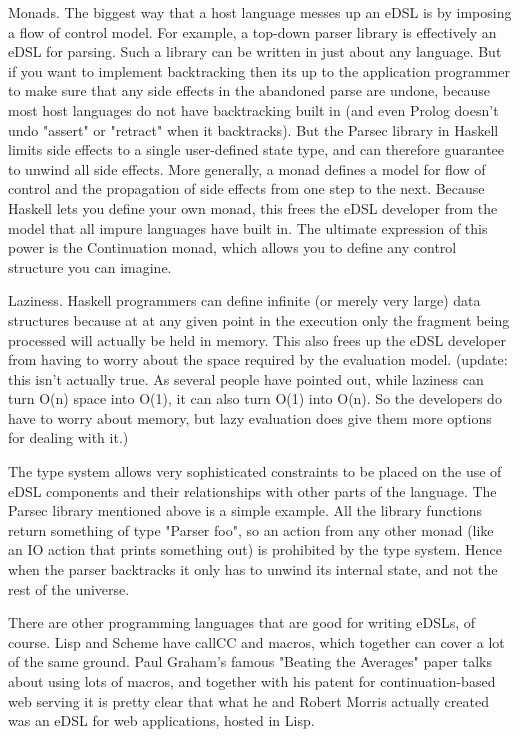 \documentclass[proposal.tex]{subfiles}
\begin{document}
\begin{enumerate}
Monads. The biggest way that a host language messes up an eDSL is by imposing a flow of control model. For example, a top-down parser library is effectively an eDSL for parsing. Such a library can be written in just about any language. But if you want to implement backtracking then its up to the application programmer to make sure that any side effects in the abandoned parse are undone, because most host languages do not have backtracking built in (and even Prolog doesn't undo "assert" or "retract" when it backtracks). But the Parsec library in Haskell limits side effects to a single user-defined state type, and can therefore guarantee to unwind all side effects. More generally, a monad defines a model for flow of control and the propagation of side effects from one step to the next. Because Haskell lets you define your own monad, this frees the eDSL developer from the model that all impure languages have built in. The ultimate expression of this power is the Continuation monad, which allows you to define any control structure you can imagine.



Laziness. Haskell programmers can define infinite (or merely very large) data structures because at at any given point in the execution only the fragment being processed will actually be held in memory. This also frees up the eDSL developer from having to worry about the space required by the evaluation model. (update: this isn't actually true. As several people have pointed out, while laziness can turn O(n) space into O(1), it can also turn O(1) into O(n). So the developers do have to worry about memory, but lazy evaluation does give them more options for dealing with it.)


The type system allows very sophisticated constraints to be placed on the use of eDSL components and their relationships with other parts of the language. The Parsec library mentioned above is a simple example. All the library functions return something of type "Parser foo", so an action from any other monad (like an IO action that prints something out) is prohibited by the type system. Hence when the parser backtracks it only has to unwind its internal state, and not the rest of the universe.


There are other programming languages that are good for writing eDSLs, of course. Lisp and Scheme have callCC and macros, which together can cover a lot of the same ground. Paul Graham's famous "Beating the Averages" paper talks about using lots of macros, and together with his patent for continuation-based web serving it is pretty clear that what he and Robert Morris actually created was an eDSL for web applications, hosted in Lisp.


\end{enumerate}
\end{document}
